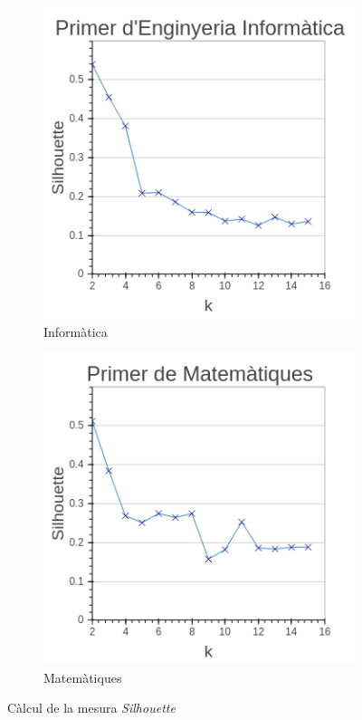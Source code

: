 \documentclass[12pt,a4paper,catalan]{article}
\begin{document}
\begin{figure}[h]
\centering
\begin{subfigure}{.45\textwidth}
  \centering
  \includegraphics[width=\linewidth]{img/silhouette_primer_info.png}
  \caption{Informàtica}
\end{subfigure}
\begin{subfigure}{.45\textwidth}
  \centering
  \includegraphics[width=\linewidth]{img/silhouette_primer_mates.png}
  \caption{Matemàtiques}
\end{subfigure}
\caption{Càlcul de la mesura \textit{Silhouette}}
\label{fig:silhouettekmeans}
\end{figure}
\end{document}

